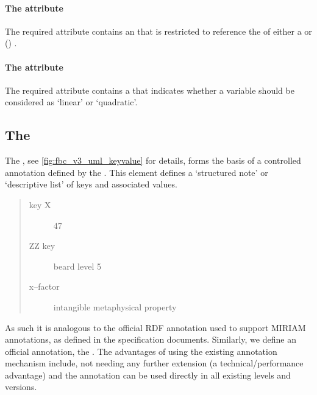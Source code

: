 \paragraph{The  attribute}
The required  attribute contains an  that is restricted to reference the  of either a \Reaction or () \Parameter.

\paragraph{The  attribute}
The required  attribute contains a  that indicates whether a variable should be considered as `linear' or `quadratic'.

\subsection{The \FBC {}}
\label{ListOfKeyValuePairs-class}

The , see \ref{fig:fbc_v3_uml_keyvalue} for details, forms the basis of a controlled annotation defined by the \FBCPackage. This element defines a `structured note' or `descriptive list' of keys and associated values. 
%
\begin{quote}
\begin{description}
  \item[key X] 47
  \item[ZZ key] beard level 5
  \item[x--factor] intangible metaphysical property
\end{description}
\end{quote}
%
As such it is analogous to the official \SBML RDF annotation used to support MIRIAM annotations, as defined in the \SBML specification documents. Similarly, we define an official \FBC annotation, the \ListOfKeyValuePairs. The advantages of using the existing \SBML annotation mechanism include, \SBase not needing any further extension (a technical/performance advantage) and the annotation can be used directly in all existing \SBML levels and versions.

